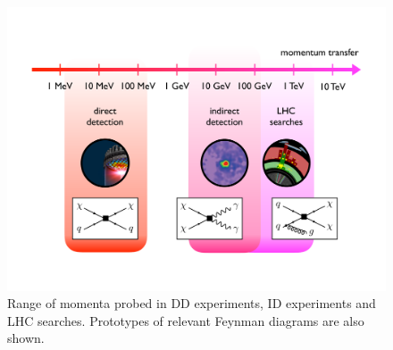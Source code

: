\documentclass[a4paper, 11pt,notoc]{article}
\begin{document}
\begin{figure}[t!]
\centering
\includegraphics[width=.85\textwidth]{figure1.pdf}
\vspace{2mm}
\caption{\label{fig:momentumtransfer} Range of momenta probed in DD experiments, ID experiments and LHC searches. Prototypes of relevant Feynman diagrams are also shown. }
\end{figure}
\end{document}
